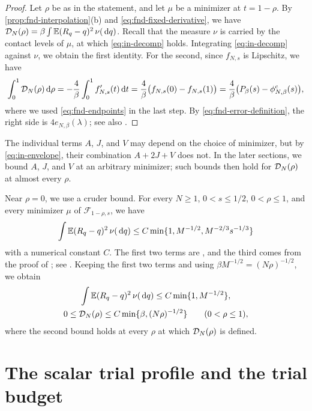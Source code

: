 \begin{proof}
Let $\rho$ be as in the statement, and let $\mu$ be a minimizer at
$t=1-\rho$. By \cref{prop:fnd-interpolation}(b) and
\eqref{eq:fnd-fixed-derivative}, we have
$\mathcal D_N(\rho)=\beta\int\mathbb E(R_q-q)^2\,\nu(\,\mathrm d q)$. Recall that the measure
$\nu$ is carried by the contact levels of $\mu$,
at which \eqref{eq:in-decomp}
holds. Integrating \eqref{eq:in-decomp} against $\nu$, we obtain the
first identity. For the second, since $f_{N,s}$ is Lipschitz, we have
\[
 \int_0^1\mathcal D_N(\rho)\,\mathrm d\rho=-\frac4\beta\int_0^1f_{N,s}'(t)\,\mathrm d t
 =\frac4\beta\bigl(f_{N,s}(0)-f_{N,s}(1)\bigr)
 =\frac4\beta\bigl(P_\beta(s)-\phi^c_{N,\beta}(s)\bigr),
\]
where we used \eqref{eq:fnd-endpoints} in the last step. By
\eqref{eq:fnd-error-definition}, the right side is
$4e_{N,\beta}(\lambda)$; see also \cite[Proposition~2.3, (2.21)]{AL}.
\end{proof}

The individual terms $A$, $J$, and $V$ may depend on the choice of
minimizer, but by \eqref{eq:in-envelope}, their combination $A+2J+V$
does not. In the later sections, we bound $A$, $J$, and $V$ at an
arbitrary minimizer; such bounds then hold for $\mathcal D_N(\rho)$ at almost
every $\rho$.

Near $\rho=0$, we use a cruder bound. For every $N\ge1$, $0<s\le1/2$,
$0<\rho\le1$, and every minimizer $\mu$ of $\mathcal F_{1-\rho,s}$, we
have
\[
 \int\mathbb E(R_q-q)^2\,\nu(\,\mathrm d q)\le C\min\{1,M^{-1/2},M^{-2/3}s^{-1/3}\}
\]
with a numerical constant $C$. The first two terms are
\cite[Lemma~4.1, (4.1)]{AL}, and the third comes from the proof of
\cite[Theorem~1.1]{AL}; see \cite[(4.2)]{AL}. Keeping the first two
terms and using $\beta M^{-1/2}=(N\rho)^{-1/2}$, we obtain
\begin{equation}\label{eq:fnd-moving}
 \begin{gathered}
 \int\mathbb E(R_q-q)^2\,\nu(\,\mathrm d q)\le C\min\{1,M^{-1/2}\},\\
 0\le\mathcal D_N(\rho)\le C\min\{\beta,(N\rho)^{-1/2}\}
 \qquad(0<\rho\le1),
 \end{gathered}
\end{equation}
where the second bound holds at every $\rho$ at which $\mathcal D_N(\rho)$ is
defined.

\section{The scalar trial profile and the trial budget}
\label{sec:fnd-trial}

